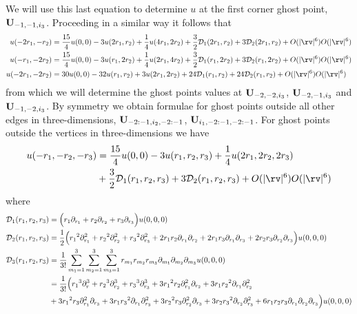 \documentclass[10pt]{article}
\begin{document}
We will use this last equation to determine $u$ at the first corner ghost point, $\mathbf{U}_{-1,-1,i_3}$.
Proceeding in a similar way it follows that
\begin{align}
 u(-2\ra,-\rb) &= {15\over4} u(0,0) - 3 u(2\ra,\rb) + {1\over 4}u(4\ra,2\rb) + {3\over2}\Ds_1(2\ra,\rb) 
                          + 3\Ds_2(2\ra,\rb) +  \trunc \trunc \label{eq:corner2}\\
 u(-\ra,-2\rb) &= {15\over4} u(0,0) - 3 u(\ra,2\rb) + {1\over 4}u(2\ra,4\rb) + {3\over2}\Ds_1(\ra,2\rb) 
                          + 3\Ds_2(\ra,2\rb) +  \trunc \trunc \label{eq:corner3}\\
 u(-2\ra,-2\rb) &=30 u(0,0) -32 u(\ra,\rb) + 3u(2\ra,2\rb) + 24 \Ds_1(\ra,\rb) + 24 \Ds_2(\ra,\rb) +  \trunc\trunc \label{eq:corner4}
\end{align}
from which we will determine the ghost points values at $\mathbf{U}_{-2,-2,i_3}$, $\mathbf{U}_{-2,-1,i_3}$ and
 $\mathbf{U}_{-1,-2,i_3}$. By symmetry we obtain formulae for ghost points outside all other edges
in three-dimensions, $\mathbf{U}_{-2:-1,i_2,-2:-1}$, $\mathbf{U}_{i_1,-2:-1,-2:-1}$. For ghost points outside
the vertices in three-dimensions we have
\begin{align}
  u(-\ra,-\rb,-\rc) &= {15\over4} u(0,0) - 3 u(\ra,\rb,\rc) + {1\over 4}u(2\ra,2\rb,2\rc)\\
    &  + {3\over2}\Ds_1(\ra,\rb,\rc) 
                          + 3\Ds_2(\ra,\rb,\rc) + \trunc\trunc \label{eq:corner5}
\end{align}
where
\begin{align*}
  {\mathcal D}_1({r_1},{r_2},{r_3}) &= \Big({r_1} \partial_{r_1} + {r_2} \partial_{r_2} + {r_3}\partial_{r_3} \Big) u(0,0,0) \\
  {\mathcal D}_2({r_1},{r_2},{r_3}) &= {1\over2}\Big( {r_1}^2\partial_{r_1}^2+ {r_2}^2\partial_{r_2}^2+ {r_3}^2\partial_{r_3}^2
      +2{r_1} {r_2}\partial_{r_1}\partial_{r_2} + 2{r_1} {r_3}\partial_{r_1}\partial_{r_3} +2{r_2} {r_3}\partial_{r_2}\partial_{r_3} 
                       \Big)u(0,0,0)  \\
  {\mathcal D}_3({r_1},{r_2},{r_3}) &= {1\over3!}\sum_{m_1=1}^3\sum_{m_2=1}^3\sum_{m_3=1}^3
                         r_{m_1} r_{m_2} r_{m_3} \partial_{m_1}\partial_{m_2}\partial_{m_3} u(0,0,0) \\
                     &={1\over3!}\Big( {r_1}^3\partial_r^3+ {r_2}^3\partial_{r_2}^3+ {r_3}^3\partial_{r_3}^3
   +3 {r_1}^2 {r_2}\partial_{r_1}^2\partial_{r_2} + 3 {r_1}{r_2}^2\partial_{r_1}\partial_{r_2}^2  \\
  & +3 {r_1}^2 {r_3}\partial_{r_1}^2\partial_{r_3} + 3 {r_1}{r_3}^2\partial_{r_1}\partial_{r_3}^2 
   +3 {r_2}^2 {r_3}\partial_{r_2}^2\partial_{r_3}+ 3 {r_2}{r_3}^2\partial_{r_2}\partial_{r_3}^2 
   +6 {r_1}{r_2}{r_3} \partial_{r_1}\partial_{r_2}\partial_{r_3}  \Big) u(0,0,0)  
\end{align*}
\end{document}
